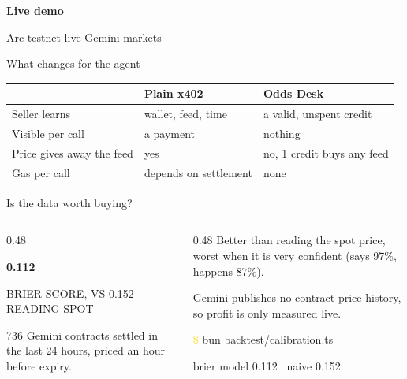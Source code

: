 \documentclass[aspectratio=169,12pt]{beamer}
\begin{document}
\begin{frame}
  \centering
  \vfill
  {\fontsize{26}{30}\selectfont\bfseries\color{white} Live demo\par}
  \medskip
  {\ttfamily\small\textcolor{sky}{Arc testnet \textbullet{} live Gemini markets}}
  \vfill
\end{frame}

\begin{frame}{What changes for the agent}
  \renewcommand{\arraystretch}{1.5}
  \begin{tabular}{@{}p{4.2cm}p{4.2cm}p{4.6cm}@{}}
    \toprule
    & \textcolor{sky}{Plain x402} & \textcolor{sand}{Odds Desk} \\
    \midrule
    Seller learns & wallet, feed, time & a valid, unspent credit \\
    Visible per call & a payment & nothing \\
    Price gives away the feed & yes & no, 1 credit buys any feed \\
    Gas per call & depends on settlement & none \\
    \bottomrule
  \end{tabular}
\end{frame}

\begin{frame}{Is the data worth buying?}
  \begin{columns}[c]
    \begin{column}{0.48\textwidth}
      {\fontsize{40}{44}\selectfont\bfseries\color{sand} 0.112\par}
      {\ttfamily\small\textcolor{sky}{BRIER SCORE, VS 0.152 READING SPOT}}
      \bigskip

      736 Gemini contracts settled in the last 24 hours, priced an hour before expiry.
    \end{column}
    \begin{column}{0.48\textwidth}
      \small
      Better than reading the spot price, worst when it is very confident (says 97\%, happens 87\%).
      \medskip

      Gemini publishes no contract price history, so profit is only measured live.
      \medskip

      \begin{term}
        \textcolor{gold}{\$} bun backtest/calibration.ts\par
        brier model 0.112 \ naive 0.152
      \end{term}
    \end{column}
  \end{columns}
\end{frame}
\end{document}
